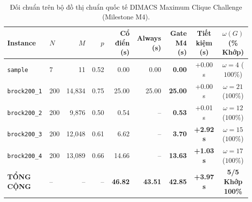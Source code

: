 \documentclass[11pt,a4paper]{article}
\begin{document}
\begin{table}[ht]
\centering
\small
\setlength{\tabcolsep}{3.0pt}
\caption{Đối chuẩn trên bộ đồ thị chuẩn quốc tế DIMACS Maximum Clique Challenge (Milestone M4).}
\label{tab:m4_dimacs}
\begin{tabularx}{\linewidth}{lXrrrrrcc}
\toprule
Instance & $N$ & $M$ & $p$ & Cổ điển (s) & Always (s) & \textbf{Gate M4 (s)} & Tiết kiệm (s) & $\omega(G)$ (\% Khớp) \\
\midrule
\texttt{sample} & 7 & 11 & 0.52 & 0.00 & 0.00 & \textbf{0.00} & +0.00 s & $\omega=4$ ($100\%$) \\
\texttt{brock200\_1} & 200 & 14,834 & 0.75 & 25.00 & 25.00 & \textbf{25.00} & +0.00 s & $\omega=21$ ($100\%$) \\
\texttt{brock200\_2} & 200 & 9,876 & 0.50 & 0.54 & -- & \textbf{0.53} & +0.01 s & $\omega=12$ ($100\%$) \\
\texttt{brock200\_3} & 200 & 12,048 & 0.61 & 6.62 & -- & \textbf{3.70} & \textbf{+2.92 s} & $\omega=15$ ($100\%$) \\
\texttt{brock200\_4} & 200 & 13,089 & 0.66 & 14.66 & -- & \textbf{13.63} & \textbf{+1.03 s} & $\omega=17$ ($100\%$) \\
\midrule
\textbf{TỔNG CỘNG} & -- & -- & -- & \textbf{46.82} & \textbf{43.51} & \textbf{42.85} & \textbf{+3.97 s} & \textbf{5/5 Khớp 100\%} \\
\bottomrule
\end{tabularx}
\end{table}
\end{document}
